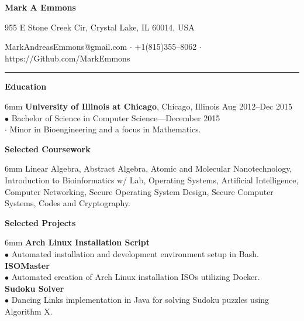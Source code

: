 \documentclass[11pt]{article}
\newcommand{\sectionheader}[1]{\noindent \textbf{\large #1}}
\newenvironment{sectionbody}{\begin{adjustwidth}{6mm}{}}{\end{adjustwidth}}
\begin{document}

\centerline{\LARGE \bf Mark A Emmons}
\centerline{955 E Stone Creek Cir, Crystal Lake, IL 60014, USA}
\centerline{MarkAndreasEmmons@gmail.com $\cdot$ +1(815)355--8062 $\cdot$ https://Github.com/MarkEmmons}

\noindent\rule{16.5cm}{0.4pt}

\sectionheader{Education}
\begin{sectionbody}
{\bf University of Illinois at Chicago}, Chicago, Illinois \hfill Aug 2012--Dec 2015 \\
$\bullet$ Bachelor of Science in Computer Science---December 2015 \\
\indent $\cdot$ Minor in Bioengineering and a focus in Mathematics.
\end{sectionbody}

\vspace{2mm}

\sectionheader{Selected Coursework}
\begin{sectionbody}
Linear Algebra, Abstract Algebra, Atomic and Molecular Nanotechnology, Introduction to Bioinformatics w/ Lab, Operating Systems, Artificial Intelligence, Computer Networking, Secure Operating System Design, Secure Computer Systems, Codes and Cryptography.
\end{sectionbody}

\vspace{2mm}

\sectionheader{Selected Projects}
\begin{sectionbody}
{\bf Arch Linux Installation Script} \\
$\bullet$ Automated installation and development environment setup in Bash. \\
{\bf ISOMaster} \\
$\bullet$ Automated creation of Arch Linux installation ISOs utilizing Docker. \\
{\bf Sudoku Solver} \\
$\bullet$ Dancing Links implementation in Java for solving Sudoku puzzles using Algorithm X.
\end{sectionbody}
\end{document}
